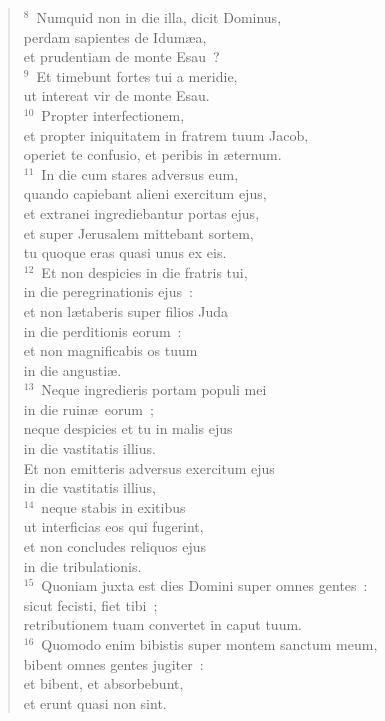 \begin{flushleft}
\begin{verse}
${}^{8}$~Numquid non in die illa, dicit Dominus,\\ perdam sapientes de Idum\ae a,\\ et prudentiam de monte Esau~?\\
${}^{9}$~Et timebunt fortes tui a meridie,\\ ut intereat vir de monte Esau.\\
${}^{10}$~Propter interfectionem,\\ et propter iniquitatem in fratrem tuum Jacob,\\ operiet te confusio, et peribis in \ae ternum.\\
${}^{11}$~In die cum stares adversus eum,\\ quando capiebant alieni exercitum ejus,\\ et extranei ingrediebantur portas ejus,\\ et super Jerusalem mittebant sortem,\\ tu quoque eras quasi unus ex eis.\\
${}^{12}$~Et non despicies in die fratris tui,\\ in die peregrinationis ejus~:\\ et non l\ae taberis super filios Juda\\ in die perditionis eorum~:\\ et non magnificabis os tuum\\ in die angusti\ae .\\
${}^{13}$~Neque ingredieris portam populi mei\\ in die ruin\ae\ eorum~;\\ neque despicies et tu in malis ejus\\ in die vastitatis illius.\\ Et non emitteris adversus exercitum ejus\\ in die vastitatis illius,\\
${}^{14}$~neque stabis in exitibus\\ ut interficias eos qui fugerint,\\ et non concludes reliquos ejus\\ in die tribulationis.\\
${}^{15}$~Quoniam juxta est dies Domini super omnes gentes~:\\ sicut fecisti, fiet tibi~;\\ retributionem tuam convertet in caput tuum.\\
${}^{16}$~Quomodo enim bibistis super montem sanctum meum,\\ bibent omnes gentes jugiter~:\\ et bibent, et absorbebunt,\\ et erunt quasi non sint.



\end{verse}
\end{flushleft}
